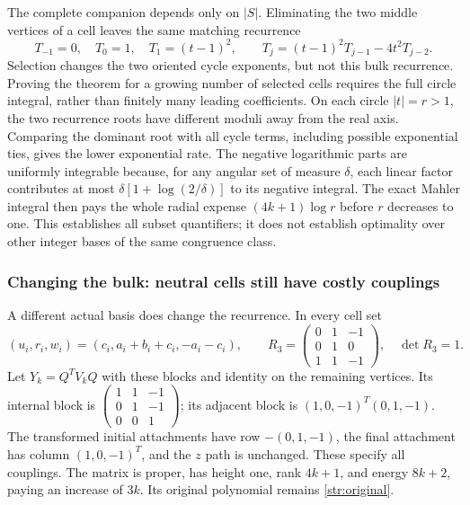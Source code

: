 The complete companion depends only on $|S|$.
Eliminating the two middle vertices of a cell leaves the same matching recurrence
\[
 T_{-1}=0,\quad T_0=1,\quad T_1=(t-1)^2,\qquad
 T_j=(t-1)^2T_{j-1}-4t^2T_{j-2}.
\]
Selection changes the two oriented cycle exponents, but not this bulk recurrence.
Proving the theorem for a growing number of selected cells requires the full circle integral, rather than finitely many leading coefficients.
On each circle $|t|=r>1$, the two recurrence roots have different moduli away from the real axis.
Comparing the dominant root with all cycle terms, including possible exponential ties, gives the lower exponential rate.
The negative logarithmic parts are uniformly integrable because, for any angular set of measure $\delta$, each linear factor contributes at most $\delta[1+\log(2/\delta)]$ to its negative integral.
The exact Mahler integral \cite{Smy08} then pays the whole radial expense $(4k+1)\log r$ before $r$ decreases to one.
This establishes all subset quantifiers; it does not establish optimality over other integer bases of the same congruence class.

\subsubsection{Changing the bulk: neutral cells still have costly couplings}
\label{str:changed}

A different actual basis does change the recurrence.
In every cell set
\[
 (u_i,r_i,w_i)=(c_i,a_i+b_i+c_i,-a_i-c_i),\qquad
 R_3=\begin{pmatrix}0&1&-1\\0&1&0\\1&1&-1\end{pmatrix},
 \quad\det R_3=1.
\]
Let $Y_k=Q^TV_kQ$ with these blocks and identity on the remaining vertices.
Its internal block is $\left(\begin{smallmatrix}1&1&-1\\0&1&-1\\0&0&1\end{smallmatrix}\right)$; its adjacent block is $(1,0,-1)^T(0,1,-1)$.
The transformed initial attachments have row $-(0,1,-1)$, the final attachment has column $(1,0,-1)^T$, and the $z$ path is unchanged.
These specify all couplings.
The matrix is proper, has height one, rank $4k+1$, and energy $8k+2$, paying an increase of $3k$.
Its original polynomial remains \eqref{str:original}.

